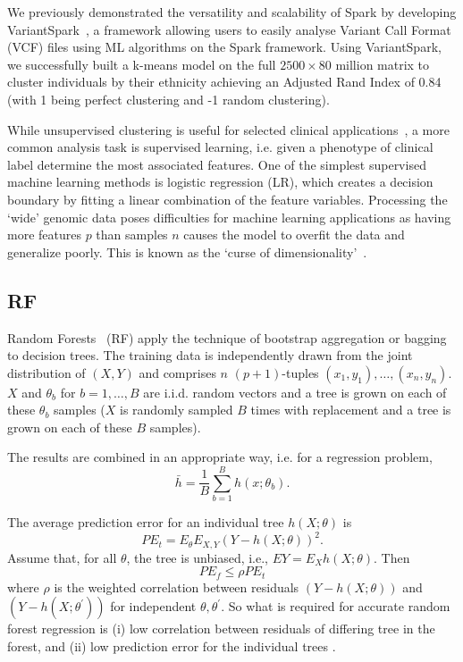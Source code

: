 \documentclass[10pt,letterpaper]{article}
\begin{document}
We previously demonstrated the versatility and scalability of Spark by developing VariantSpark~\cite{OBrien2015}, a
framework allowing users to easily analyse Variant Call Format (VCF) files using ML algorithms on the Spark framework.
Using VariantSpark, we successfully built a k-means model on the full
$2500 \times 80$ million matrix to cluster individuals by
their ethnicity achieving an Adjusted Rand Index of 0.84 (with 1 being perfect clustering  and -1 random clustering).


While unsupervised clustering is useful for selected clinical applications~\cite{Li2015}, a more common analysis task is
supervised learning, i.e. given a phenotype of clinical label determine the most associated features.  One of the
simplest supervised machine learning methods is logistic regression (LR), which creates a decision boundary by fitting a
linear combination of the feature variables.  Processing the `wide' genomic data poses difficulties for machine learning
applications as having more features $p$ than samples $n$ causes the model to overfit the data and generalize poorly.
This is known as the `curse of dimensionality'~\cite{Bauer2014}.  

\subsection*{RF}  

Random Forests~\cite{Breiman.2001} (RF) apply the technique of bootstrap aggregation or bagging to decision trees.  The training
data is independently drawn from the joint distribution of $(X,Y)$ and comprises $n$ $(p+1)$-tuples $(x_1,y_1),\ldots, (x_n,y_n)$.
$X$ and $\theta_b$ for $b=1,\ldots,B$ are i.i.d. random vectors and a tree is grown on each of these $\theta_b$  samples 
($X$ is randomly sampled $B$ times with replacement and a tree is grown on each of these $B$ samples). 

The results are combined in an appropriate way, i.e. for a regression problem,
\begin{equation*}
{\bar {h}}={\frac {1}{B}}\sum _{b=1}^{B} h(x;\theta_b).
\end{equation*}




The average prediction error for an individual tree $h(X; \theta)$ is
\begin{equation}
PE_t = E_\theta E_{X,Y} (Y-h(X; \theta))^2.
\end{equation}
Assume that, for all  $\theta$, the tree is unbiased, i.e., $EY= E_X h(X; \theta)$. Then
\begin{equation}
PE_f \leq \rho PE_t
\end{equation}
where $\rho$ is the weighted correlation between residuals $(Y-h(X;\theta))$ and $(Y-h(X;\theta^\prime))$ for independent $\theta,
\theta^\prime$.  
So what is required for  accurate random forest regression is (i) low correlation between residuals of differing tree in
the forest, and (ii) low prediction error for the individual trees \cite{Segal.2004}.
\end{document}
